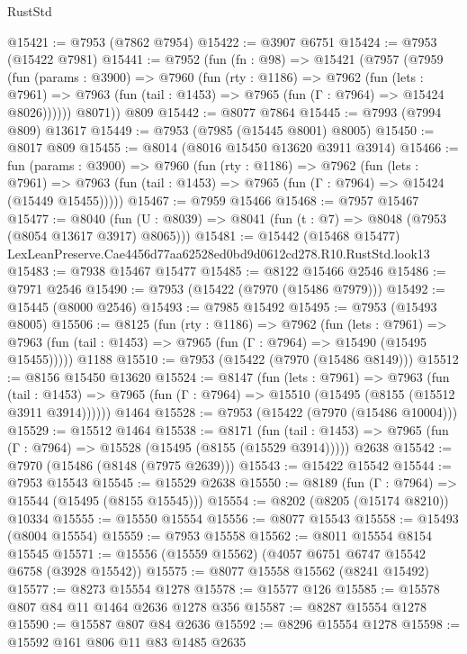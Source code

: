 \begin{lexlean}{RustStd}
\begin{coremodule}
@15421 := @7953 (@7862 @7954)
@15422 := @3907 @6751
@15424 := @7953 (@15422 @7981)
@15441 := @7952
    (fun (fn : @98) =>
    @15421
      (@7957
        (@7959
          (fun (params : @3900) =>
          @7960
            (fun (rty : @1186) =>
            @7962
              (fun (lets : @7961) =>
              @7963 (fun (tail : @1453) => @7965 (fun (Γ : @7964) => @15424 @8026))))))
        @8071))
    @809
@15442 := @8077 @7864
@15445 := @7993 (@7994 @809) @13617
@15449 := @7953 (@7985 (@15445 @8001) @8005)
@15450 := @8017 @809
@15455 := @8014 (@8016 @15450 @13620 @3911 @3914)
@15466 := fun (params : @3900) =>
  @7960
    (fun (rty : @1186) =>
    @7962
      (fun (lets : @7961) =>
      @7963 (fun (tail : @1453) => @7965 (fun (Γ : @7964) => @15424 (@15449 @15455)))))
@15467 := @7959 @15466
@15468 := @7957 @15467
@15477 := @8040
    (fun (U : @8039) => @8041 (fun (t : @7) => @8048 (@7953 (@8054 @13617 @3917) @8065)))
@15481 := @15442
    (@15468 @15477)
    LexLeanPreserve.Cae4456d77aa62528ed0bd9d0612cd278.R10.RustStd.look13
@15483 := @7938 @15467 @15477
@15485 := @8122 @15466 @2546
@15486 := @7971 @2546
@15490 := @7953 (@15422 (@7970 (@15486 @7979)))
@15492 := @15445 (@8000 @2546)
@15493 := @7985 @15492
@15495 := @7953 (@15493 @8005)
@15506 := @8125
    (fun (rty : @1186) =>
    @7962
      (fun (lets : @7961) =>
      @7963 (fun (tail : @1453) => @7965 (fun (Γ : @7964) => @15490 (@15495 @15455)))))
    @1188
@15510 := @7953 (@15422 (@7970 (@15486 @8149)))
@15512 := @8156 @15450 @13620
@15524 := @8147
    (fun (lets : @7961) =>
    @7963
      (fun (tail : @1453) =>
      @7965 (fun (Γ : @7964) => @15510 (@15495 (@8155 (@15512 @3911 @3914))))))
    @1464
@15528 := @7953 (@15422 (@7970 (@15486 @10004)))
@15529 := @15512 @1464
@15538 := @8171
    (fun (tail : @1453) => @7965 (fun (Γ : @7964) => @15528 (@15495 (@8155 (@15529 @3914)))))
    @2638
@15542 := @7970 (@15486 (@8148 (@7975 @2639)))
@15543 := @15422 @15542
@15544 := @7953 @15543
@15545 := @15529 @2638
@15550 := @8189 (fun (Γ : @7964) => @15544 (@15495 (@8155 @15545)))
@15554 := @8202 (@8205 (@15174 @8210)) @10334
@15555 := @15550 @15554
@15556 := @8077 @15543
@15558 := @15493 (@8004 @15554)
@15559 := @7953 @15558
@15562 := @8011 @15554 @8154 @15545
@15571 := @15556 (@15559 @15562) (@4057 @6751 @6747 @15542 @6758 (@3928 @15542))
@15575 := @8077 @15558 @15562 (@8241 @15492)
@15577 := @8273 @15554 @1278
@15578 := @15577 @126
@15585 := @15578 @807 @84 @11 @1464 @2636 @1278 @356
@15587 := @8287 @15554 @1278
@15590 := @15587 @807 @84 @2636
@15592 := @8296 @15554 @1278
@15598 := @15592 @161 @806 @11 @83 @1485 @2635

\end{coremodule}
\end{lexlean}
